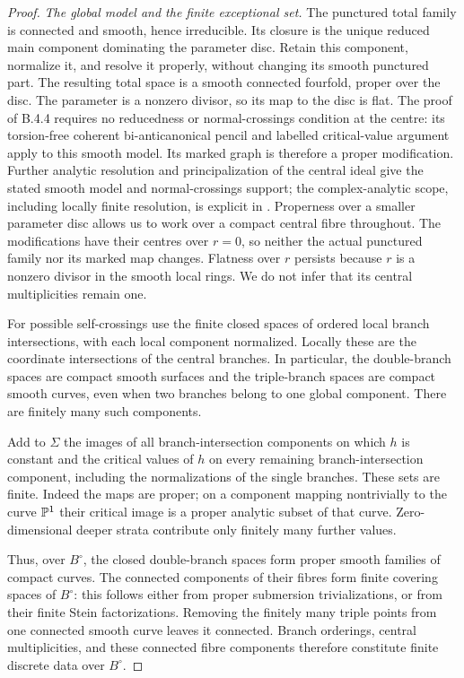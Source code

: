 \begin{proof}
\emph{The global model and the finite exceptional set.}
The punctured total family is connected and smooth, hence
irreducible. Its closure is the unique reduced main component
dominating the parameter disc. Retain this component, normalize
it, and resolve it properly, without changing its smooth
punctured part. The resulting total space is a smooth connected
fourfold, proper over the disc. The parameter is a nonzero
divisor, so its map to the disc is flat. The proof of B.4.4
requires no reducedness or normal-crossings condition at the
centre: its torsion-free coherent bi-anticanonical pencil and
labelled critical-value argument apply to this smooth model.
Its marked graph is therefore a proper modification.
Further analytic resolution and principalization of the central
ideal give the stated smooth
model and normal-crossings support; the complex-analytic scope,
including locally finite resolution, is explicit in
\citet[Theorems 1.6 and 1.10 and the paragraph following
Theorem 1.6]{BM95AB}. Properness over a smaller parameter disc
allows us to work over a compact central fibre throughout.
The modifications have their centres over $r=0$, so neither
the actual punctured family nor its marked map changes.
Flatness over $r$ persists because $r$ is a nonzero divisor in
the smooth local rings. We do not infer that its central
multiplicities remain one.

For possible self-crossings use the finite closed spaces of
ordered local branch intersections, with each local component
normalized. Locally these are the coordinate intersections of
the central branches. In particular, the double-branch spaces
are compact smooth surfaces and the triple-branch spaces are
compact smooth curves, even when two branches belong to one
global component. There are finitely many such components.

Add to $\Sigma$ the images of all branch-intersection components
on which $h$ is constant and the critical values of $h$ on every
remaining branch-intersection component, including the
normalizations of the single branches. These sets are finite.
Indeed the maps are proper; on a component mapping nontrivially
to the curve $\mathbb P^1$ their critical image is a proper analytic
subset of that curve. Zero-dimensional deeper strata contribute
only finitely many further values.

Thus, over $B^\circ$, the closed double-branch spaces form
proper smooth families of compact curves. The connected
components of their fibres form finite covering spaces of
$B^\circ$: this follows either from proper submersion
trivializations, or from their finite Stein factorizations.
Removing the finitely many triple points from one connected
smooth curve leaves it connected. Branch orderings, central
multiplicities, and these connected fibre components therefore
constitute finite discrete data over $B^\circ$.


\end{proof}
